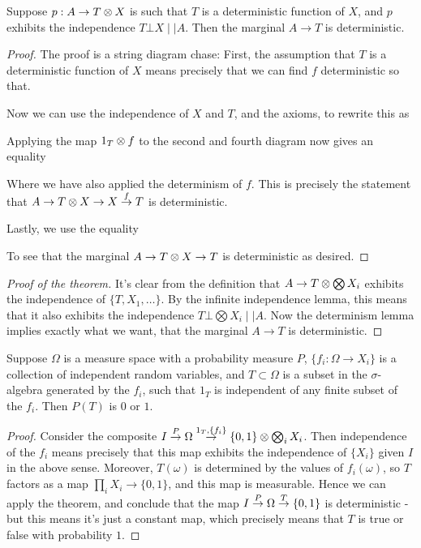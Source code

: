 \documentclass[11pt]{article}
\begin{document}
\begin{lemma}
    Suppose $p: A \to T \otimes X$ is such that $T$ is a deterministic function of $X$, and $p$ exhibits the independence $T \bot X \mid \mid A$.
    Then the marginal $A \to T$ is deterministic.
\end{lemma}
\begin{proof}
The proof is a string diagram chase:
First, the assumption that $T$ is a deterministic function of $X$ means precisely that we can find $f$ deterministic so that.


Now we can use the independence of $X$ and $T$, and the axioms, to rewrite this as


Applying the map $1_T \otimes f$ to the second and fourth diagram now gives an equality


Where we have also applied the determinism of $f$.
This is precisely the statement that $A \to T \otimes X \to X \overset{f}{\to} T$ is deterministic.

Lastly, we use the equality 


To see that the marginal $A \to T \otimes X \to T$ is deterministic as desired.

\end{proof}


\begin{proof}[Proof of the theorem]
    It's clear from the definition that $A \to T \otimes \bigotimes X_i$ exhibits the independence of $\{T, X_1, \dots\}$.
    By the infinite independence lemma, this means that it also exhibits the independence $T \bot \bigotimes X_i \mid \mid A$.
    Now the determinism lemma implies exactly what we want, that the marginal $A \to T$ is deterministic.
\end{proof}

\begin{corollary}
    Suppose $\Omega$ is a measure space with a probability measure $P$, $\{f_i: \Omega \to X_i\}$ is a collection of independent random variables,
    and $T \subset \Omega$ is a subset in the $\sigma$-algebra generated by the $f_i$, such that $1_T$ is independent of any finite subset of the $f_i$.
    Then $P(T)$ is $0$ or $1$.
\end{corollary}
\begin{proof}
    Consider the composite $I \overset{P}{\to} \Omega \overset{1_T, \{f_i\}}{\to} \{0,1\} \otimes \bigotimes_i X_i$.
    Then independence of the $f_i$ means precisely that this map exhibits the independence of $\{X_i\}$ given $I$ in the above sense.
    Moreover, $T(\omega)$ is determined by the values of $f_i(\omega)$, so $T$ factors as a map $\prod_i X_i \to \{0,1\}$, and
    this map is measurable.
    Hence we can apply the theorem, and conclude that the map $I \overset{P}{\to} \Omega \overset{T}{\to} \{0,1\}$ is deterministic - but this means it's just a constant map,
    which precisely means that $T$ is true or false with probability $1$.
\end{proof}
\end{document}
